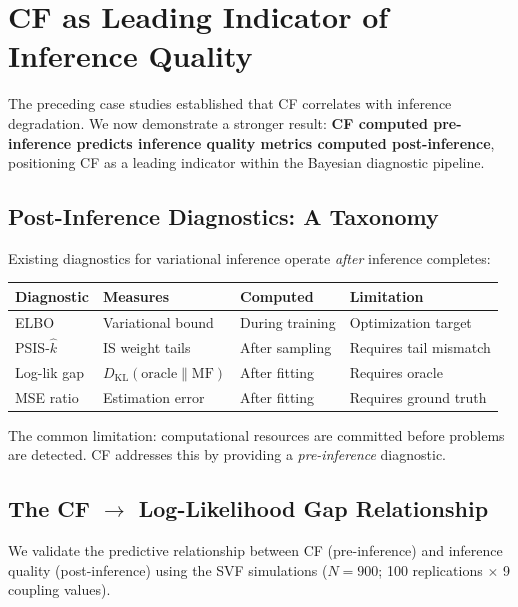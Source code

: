 \documentclass[10pt]{article} %
\theoremstyle{plain}
\theoremstyle{definition}
\newcommand{\KL}{D_{\mathrm{KL}}}
\begin{document}
\section{CF as Leading Indicator of Inference Quality}
\label{sec:psis}

The preceding case studies established that CF correlates with inference degradation. We now demonstrate a stronger result: \textbf{CF computed pre-inference predicts inference quality metrics computed post-inference}, positioning CF as a leading indicator within the Bayesian diagnostic pipeline.

\subsection{Post-Inference Diagnostics: A Taxonomy}

Existing diagnostics for variational inference operate \emph{after} inference completes:

\begin{center}
\begin{tabular}{llll}
\toprule
Diagnostic & Measures & Computed & Limitation \\
\midrule
ELBO & Variational bound & During training & Optimization target \\
PSIS-$\hat{k}$ & IS weight tails & After sampling & Requires tail mismatch \\
Log-lik gap & $\KL(\text{oracle} \| \text{MF})$ & After fitting & Requires oracle \\
MSE ratio & Estimation error & After fitting & Requires ground truth \\
\bottomrule
\end{tabular}
\end{center}

\noindent The common limitation: computational resources are committed before problems are detected. CF addresses this by providing a \emph{pre-inference} diagnostic.

\subsection{The CF $\to$ Log-Likelihood Gap Relationship}

We validate the predictive relationship between CF (pre-inference) and inference quality (post-inference) using the SVF simulations ($N = 900$; 100 replications $\times$ 9 coupling values).
\end{document}
